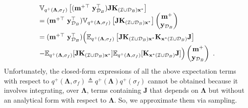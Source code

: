 \documentclass[conference]{IEEEtran}
\begin{document}
	\begin{equation*}
		\begin{array}{l}
			\mathbb{V}_{q^+(\mathbf{\Lambda},\sigma_f)}\left[
			(\mathbf{m}^{+\top}\ \mathbf{y}^{\top}_{\mathcal{D}_B})
			\mathbf{J}
			\mathbf{K}_{(\mathcal{I}\cup\mathcal{D}_B)\mathbf{x}^*} \right]\\
			=(\mathbf{m}^{+\top}\ \mathbf{y}^{\top}_{\mathcal{D}_B})
			\mathbb{V}_{q^+(\mathbf{\Lambda},\sigma_f)}\left[
			\mathbf{J}
			\mathbf{K}_{(\mathcal{I}\cup\mathcal{D}_B)\mathbf{x}^*} \right]
			\begin{pmatrix}
				\mathbf{m}^{+} \\
				\mathbf{y}_{\mathcal{D}_B}
			\end{pmatrix}
			\vspace{1mm}\\
			=(\mathbf{m}^{+\top}\ \mathbf{y}^{\top}_{\mathcal{D}_B})
			\Big(\mathbb{E}_{q^+(\mathbf{\Lambda},\sigma_f)}\left[\mathbf{J}
			\mathbf{K}_{(\mathcal{I}\cup\mathcal{D}_B)\mathbf{x}^*}
			\mathbf{K}_{\mathbf{x}^*(\mathcal{I}\cup\mathcal{D}_B)}\mathbf{J} \right]\vspace{1mm}\\
			\displaystyle  -  \mathbb{E}_{q^+(\mathbf{\Lambda},\sigma_f)}[\mathbf{J}
			\mathbf{K}_{(\mathcal{I}\cup\mathcal{D}_B)\mathbf{x}^*} ]\mathbb{E}_{q^+(\mathbf{\Lambda},\sigma_f)}[\mathbf{K}_{\mathbf{x}^*(\mathcal{I}\cup\mathcal{D}_B)}\mathbf{J} ]\Big)\begin{pmatrix}
				\mathbf{m}^{+} \\
				\mathbf{y}_{\mathcal{D}_B}
			\end{pmatrix}\ .
		\end{array}
	\end{equation*}
	Unfortunately, the closed-form expressions of all the above expectation terms  with respect to $q^+(\mathbf{\Lambda},\sigma_f)\triangleq q^+(\mathbf{\Lambda})q^+(\sigma_f)$ cannot be obtained because it involves integrating, over $\mathbf{\Lambda}$, terms containing $\mathbf{J}$ that depends on $\mathbf{\Lambda}$ but without an analytical form with respect to $\mathbf{\Lambda}$.
	So, we approximate them via sampling.
\end{document}
